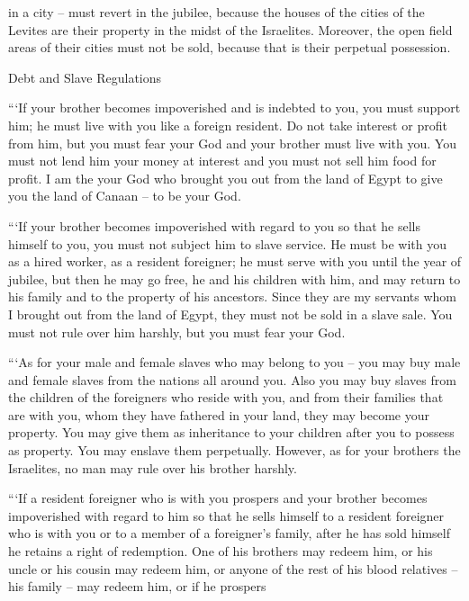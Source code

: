 {in a city
– must revert in the jubilee,
because
the houses
of the cities
of the Levites
are their property
in the midst
of the Israelites.
Moreover, the open
field
areas
of their cities
must not
be sold,
because
that is their perpetual
possession.
\par }{\SH Debt and Slave Regulations
\par }{\PP {}“‘If
your brother
becomes impoverished
and is indebted to you,
you must support
him; he must live
with
you like a foreign
resident.
Do not
take
interest
or profit
from him, but you must fear
your God
and your brother
must live
with you.
You must not
lend
him your money
at interest
and you must not
sell
him food
for profit.
I am
the {}
your God
who
brought you out
from the land
of Egypt
to give
you the land
of Canaan
– to be
your God.
\par }{\PP {}“‘If
your brother
becomes impoverished
with
regard to you so that he sells
himself to you, you must not
subject
him to slave
service.
He must be
with you
as a hired worker,
as a resident foreigner;
he must serve
with you
until
the year
of jubilee,
but then he may
go
free,
he and his children
with
him, and may return
to
his family
and to
the property
of his ancestors.
Since
they are
my servants
whom
I brought out
from the land
of Egypt,
they must not
be sold
in a slave
sale.
You must not
rule
over him harshly,
but you must fear
your God.
\par }{\PP {}“‘As for your male
and female
slaves
who
may belong to you – you may buy male and female slaves from the nations all around you.
Also
you may buy
slaves from the children
of the foreigners
who reside
with
you, and from their
families
that
are with
you, whom
they have fathered
in your land,
they may become
your property.
You may give them as inheritance
to your children
after
you to possess
as property.
You may enslave
them perpetually.
However, as for your brothers
the Israelites,
no
man
may rule
over his brother
harshly.
\par }{\PP {}“‘If
a resident
foreigner
who is with
you prospers
and your brother
becomes impoverished
with
regard to him so that he sells
himself to a resident
foreigner
who is with
you or
to a member
of a foreigner’s
family,
after
he has sold
himself he retains a right of redemption.
One
of his brothers
may redeem him,
or
his uncle
or
his cousin
may redeem
him, or
anyone of the rest of his blood relatives
– his family –
may redeem
him, or
if he prospers
}
